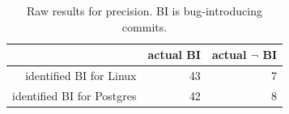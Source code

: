 
\begin{table}
\begin{center}
\begin{tabular}{r|r|r}
& actual BI & actual $\neg$ BI \\ \hline
identified BI for Linux & 43 & 7 \\

identified BI for Postgres & 42 & 8 \\
\end{tabular}
\end{center}
\caption{\label{tab:pr-raw}Raw results for precision. BI is bug-introducing commits.}


\end{table}


